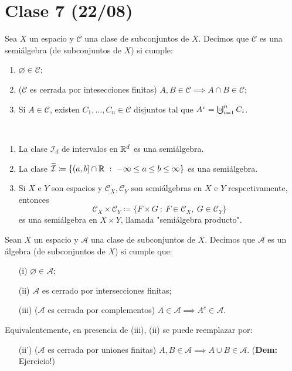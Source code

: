\section{Clase 7 (22/08)}

\begin{definition}[semiálgebra]
	Sea $X$ un espacio y $\mathscr{C}$ una clase de subconjuntos de $X$. Decimos que $\mathscr{C}$ es una semiálgebra (de subconjuntos de $X$) si cumple:
	\begin{enumerate}
		\item $\varnothing \in \mathscr{C}$;

		\item ($\mathscr{C}$ es cerrada por intesecciones finitas) $A,B\in\mathscr{C} \implies A \cap B \in \mathscr{C}$;
		
		\item Si $A \in \mathscr{C}$, existen $C_1,\dots,C_n \in \mathscr{C}$ disjuntos tal que $A^c = \textbigcupd_{i=1}^{n} C_i$.
	\end{enumerate}
\end{definition}
	
\begin{eg}~
	\begin{enumerate}
		\item La clase $\mathcal{I}_d$ de intervalos en $\mathbb{R}^d$ es una semiálgebra.

		\item La clase $\widetilde{\mathcal{I}} \coloneq \{ (a,b] \cap \mathbb{R} \ : \ -\infty \leq a \leq b \leq \infty \}$ es una semiálgebra.

		\item Si $X$ e $Y$ son espacios y $\mathscr{C}_X, \mathscr{C}_Y$ son semiálgebras en $X$ e $Y$ respectivamente, entonces
		\[ \mathscr{C}_X \times \mathscr{C}_Y \coloneq \{ F \times G \ : \ F \in \mathscr{C}_X,\ G \in \mathscr{C}_Y \} \]
		es una semiálgebra en $X \times Y$, llamada "semiálgebra producto".
	\end{enumerate}
\end{eg}

\begin{definition}[álgebra]
	Sean $X$ un espacio y $\mathscr{A}$ una clase de subconjuntos de $X$. Decimos que $\mathscr{A}$ es un álgebra (de subconjuntos de $X$) si cumple que:
	\begin{enumerate}
		\item[(i)] $\varnothing \in \mathscr{A}$;
		
		\item[(ii)] $\mathscr{A}$ es cerrado por intersecciones finitas;

		\item[(iii)] ($\mathscr{A}$ es cerrada por complementos) $A \in \mathscr{A} \implies A^c \in \mathscr{A}$. 
	\end{enumerate}	
		\noindent Equivalentemente, en presencia de (iii), (ii) se puede reemplazar por:	
	\begin{enumerate}
		\item[(ii')] ($\mathscr{A}$ es cerrada por uniones finitas) $A,B\in \mathscr{A} \implies A \cup B \in \mathscr{A}$. (\textbf{Dem:} Ejercicio!)
	\end{enumerate}
\end{definition}

